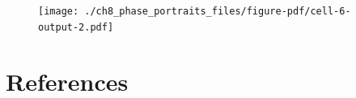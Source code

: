 \documentclass[
  letterpaper,
  DIV=11,
  numbers=noendperiod]{scrreprt}
\newlength{\cslhangindent}
\newlength{\cslentryspacingunit} %
\newenvironment{CSLReferences}[2] %
 {%
  \setlength{\parindent}{0pt}
  \ifodd #1
  \let\oldpar\par
  \def\par{\hangindent=\cslhangindent\oldpar}
  \fi
  \setlength{\parskip}{#2\cslentryspacingunit}
 }%
 {}
\begin{document}
\begin{figure}[H]

{\centering \texttt{[image: ./ch8\_phase\_portraits\_files/figure-pdf/cell-6-output-2.pdf]}

}

\end{figure}


\hypertarget{references}{%
\chapter*{References}\label{references}}

\hypertarget{refs}{}
\begin{CSLReferences}{0}{0}
\end{CSLReferences}
\end{document}
